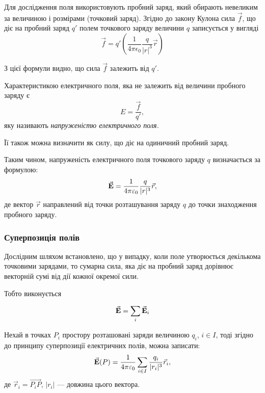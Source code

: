 Для дослідження поля використовують пробний заряд, який обирають невеликим за величиною і розмірами (точковий заряд). Згідно до закону Кулона сила $\vec f$, що діє на пробний заряд  $q'$  полем точкового заряду величини $q$ записується у вигляді
\begin{equation}
	\vec f = q' \left( \frac{1}{4 \pi \epsilon_0} \frac{q}{|r|^3} \vec r \right)
\end{equation}

З цієї формули видно, що сила $\vec f$ залежить від $q'$.

\begin{definition}
	Характеристикою електричного поля, яка не залежить від величини пробного заряду є
	\begin{equation}
		E = \frac{\vec f}{q'},
	\end{equation}
	яку називають \it{напруженістю електричного поля}.
\end{definition}

\begin{remark}
	Її також можна визначити як силу, що діє на одиничний пробний заряд.
\end{remark}

Таким чином,  напруженість електричного поля точкового заряду $q$ визначається за формулою:
\begin{equation}
	{\vec{\mathbf{E}}} = \frac{1}{4 \pi \varepsilon_0} \frac{q}{|r|^3} \vec r,
\end{equation}
де вектор $\vec r$ направлений від точки розташування заряду $q$ до точки знаходження пробного заряду. 

\subsubsection{Суперпозиція полів}

Дослідним шляхом встановлено, що у випадку, коли поле утворюється декількома точковими зарядами, то сумарна сила, яка діє на пробний заряд дорівнює векторній сумі від дії кожної окремої сили. \medskip

Тобто виконується
\begin{th_principle}
	\begin{equation}
		{\vec{\mathbf{E}}} = \displaystyle\sum\limits_i {\vec{\mathbf{E}}}_i	
	\end{equation}
\end{th_principle}

Нехай в точках $P_i$ простору розташовані заряди величиною $q_i$, $i \in I$, тоді згідно до принципу суперпозиції електричних полів, можна записати:
\begin{equation}
	{\vec{\mathbf{E}}}(P) = \frac{1}{4 \pi \varepsilon_0} \displaystyle\sum\limits_{i \in I} \frac{q_i}{|r_i|^3} \vec r_i,
\end{equation}
де $\vec r_i = \overrightarrow{P_iP}$, $|r_i|$ --- довжина цього вектора. \medskip

